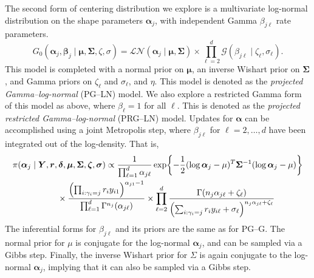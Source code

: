 The second form of centering distribution we explore is a multivariate log-normal distribution on the shape parameters $\bm{\alpha}_j$, with independent Gamma $\beta_{j\ell}$ rate parameters.  
\begin{equation}
    G_0\left(\bm{\alpha}_j,\bm{\beta}_j\mid\bm{\mu},\bm{\Sigma},\zeta,\sigma\right) = \mathcal{LN}\left(\bm{\alpha}_j\mid\bm{\mu},\bm{\Sigma}\right)\times\prod_{\ell = 2}^d\mathcal{G}\left(\beta_{j\ell}\mid\zeta_{\ell},\sigma_{\ell}\right).
\end{equation}
This model is completed with a normal prior on $\bm{\mu}$, an inverse Wishart prior on $\bm{\Sigma}$, and Gamma priors on $\zeta_{\ell}$ and $\sigma_{\ell}$, and $\eta$.  This model is denoted as the \emph{projected Gamma--log-normal} (PG--LN) model.  We also explore a restricted Gamma form of this model as above, where $\beta_{\ell} = 1$ for all $\ell$.  This is denoted as the \emph{projected restricted Gamma--log-normal} (PRG--LN) model.  Updates for $\bm{\alpha}$ can be accomplished using a joint Metropolis step, where $\beta_{j\ell}$ for $\ell = 2,\ldots,d$ have been integrated out of the log-density.  That is,
\begin{equation*}
    \begin{aligned}
    \pi(\bm{\alpha}_j\mid\bm{Y},\bm{r},\bm{\delta},\bm{\mu},\bm{\Sigma},\bm{\zeta},\bm{\sigma})
    &\propto
    \frac{1}{\prod_{\ell = 1}^d\alpha_{j\ell}}\exp\left\lbrace-\frac{1}{2}(\log\bm{\alpha}_j - \mu)^T\bm{\Sigma}^{-1}(\log\bm{\alpha}_j - \mu)\right\rbrace \\
    &\hspace{-2cm}\times \frac{\left(\prod_{i:\gamma_i = j}r_iy_{i1}\right)^{\alpha_{j1} - 1}}{\prod_{\ell = 1}^d\Gamma^{n_j}(\alpha_{j\ell})}\times \prod_{\ell = 2}^d\frac{\Gamma\left(n_j\alpha_{j\ell} + \zeta_{\ell}\right)}{\left(\sum_{i:\gamma_i = j}r_iy_{i\ell} + \sigma_{\ell}\right)^{n_j\alpha_{j\ell} + \zeta_{\ell}}}
    \end{aligned}
\end{equation*}
The inferential forms for $\beta_{j\ell}$ and its priors are the same as for PG--G.  The 
  normal prior for $\mu$ is conjugate for the log-normal $\bm{\alpha}_j$, and can be sampled
  via a Gibbs step.  Finally, the inverse Wishart prior for $\Sigma$ is again conjugate to
  the log-normal $\bm{\alpha}_j$, implying that it can also be sampled via a Gibbs step.

